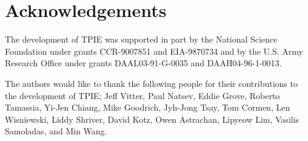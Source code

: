 
\chapter*{Acknowledgements}

The development of TPIE was supported in part by the National Science
Foundation under grants CCR-9007851 and EIA-9870734 and by the U.S.
Army Research Office under grants DAAL03-91-G-0035 and
DAAH04-96-1-0013.

The authors would like to thank the following people for their
contributions to the development of TPIE; Jeff Vitter, Paul Natsev,
Eddie Grove, Roberto Tamassia, Yi-Jen Chiang, Mike Goodrich, Jyh-Jong
Tsay, Tom Cormen, Len Wisniewski, Liddy Shriver, David Kotz, Owen
Astrachan, Lipyeow Lim, Vasilis Samoladas, and Min Wang.


